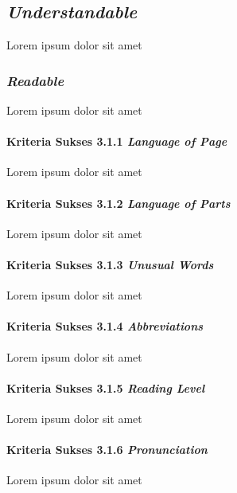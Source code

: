 
\subsection{\textit{Understandable}}
\label{sec:understandable}
Lorem ipsum dolor sit amet

\subsubsection{\textit{Readable}}
\label{sec:readable}
Lorem ipsum dolor sit amet

\paragraph{Kriteria Sukses 3.1.1 \textit{Language of Page}}
\label{sec:kriteria_sukses_3.1.1}
Lorem ipsum dolor sit amet

\paragraph{Kriteria Sukses 3.1.2 \textit{Language of Parts}}
\label{sec:kriteria_sukses_3.1.2}
Lorem ipsum dolor sit amet

\paragraph{Kriteria Sukses 3.1.3 \textit{Unusual Words}}
\label{sec:kriteria_sukses_3.1.3}
Lorem ipsum dolor sit amet

\paragraph{Kriteria Sukses 3.1.4 \textit{Abbreviations}}
\label{sec:kriteria_sukses_3.1.4}
Lorem ipsum dolor sit amet

\paragraph{Kriteria Sukses 3.1.5 \textit{Reading Level}}
\label{sec:kriteria_sukses_3.1.5}
Lorem ipsum dolor sit amet

\paragraph{Kriteria Sukses 3.1.6 \textit{Pronunciation}}
\label{sec:kriteria_sukses_3.1.6}
Lorem ipsum dolor sit amet

